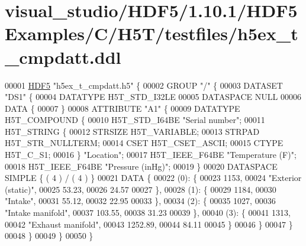 \hypertarget{visual__studio_2_h_d_f5_21_810_81_2_h_d_f5_examples_2_c_2_h5_t_2testfiles_2h5ex__t__cmpdatt_8ddl_source}{}\section{visual\+\_\+studio/\+H\+D\+F5/1.10.1/\+H\+D\+F5\+Examples/\+C/\+H5\+T/testfiles/h5ex\+\_\+t\+\_\+cmpdatt.ddl}
\label{visual__studio_2_h_d_f5_21_810_81_2_h_d_f5_examples_2_c_2_h5_t_2testfiles_2h5ex__t__cmpdatt_8ddl_source}

\begin{DoxyCode}
00001 \hyperlink{namespace_h_d_f5}{HDF5} \textcolor{stringliteral}{"h5ex\_t\_cmpdatt.h5"} \{
00002 GROUP \textcolor{stringliteral}{"/"} \{
00003    DATASET \textcolor{stringliteral}{"DS1"} \{
00004       DATATYPE  H5T\_STD\_I32LE
00005       DATASPACE  NULL
00006       DATA \{
00007       \}
00008       ATTRIBUTE \textcolor{stringliteral}{"A1"} \{
00009          DATATYPE  H5T\_COMPOUND \{
00010             H5T\_STD\_I64BE \textcolor{stringliteral}{"Serial number"};
00011             H5T\_STRING \{
00012                STRSIZE H5T\_VARIABLE;
00013                STRPAD H5T\_STR\_NULLTERM;
00014                CSET H5T\_CSET\_ASCII;
00015                CTYPE H5T\_C\_S1;
00016             \} \textcolor{stringliteral}{"Location"};
00017             H5T\_IEEE\_F64BE \textcolor{stringliteral}{"Temperature (F)"};
00018             H5T\_IEEE\_F64BE \textcolor{stringliteral}{"Pressure (inHg)"};
00019          \}
00020          DATASPACE  SIMPLE \{ ( 4 ) / ( 4 ) \}
00021          DATA \{
00022          (0): \{
00023                1153,
00024                \textcolor{stringliteral}{"Exterior (static)"},
00025                53.23,
00026                24.57
00027             \},
00028          (1): \{
00029                1184,
00030                \textcolor{stringliteral}{"Intake"},
00031                55.12,
00032                22.95
00033             \},
00034          (2): \{
00035                1027,
00036                \textcolor{stringliteral}{"Intake manifold"},
00037                103.55,
00038                31.23
00039             \},
00040          (3): \{
00041                1313,
00042                \textcolor{stringliteral}{"Exhaust manifold"},
00043                1252.89,
00044                84.11
00045             \}
00046          \}
00047       \}
00048    \}
00049 \}
00050 \}
\end{DoxyCode}
